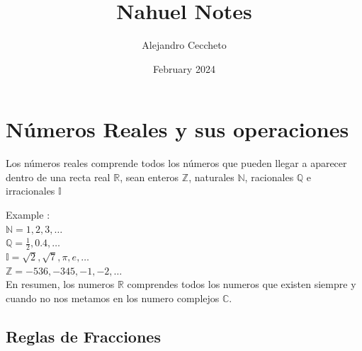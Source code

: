 \documentclass{article}
\title{Nahuel Notes}
\author{Alejandro Ceccheto}
\date{February 2024}
\begin{document}
	
	\maketitle
	
	
	\pagebreak
	\tableofcontents
	\pagebreak
	
	
	\section{Números Reales y sus operaciones}
	\begin{theo}
		Los números reales comprende todos los números que pueden llegar a aparecer dentro de una recta real $\mathbb{R}$, sean enteros $\mathbb{Z}$, naturales $\mathbb{N}$, racionales $\mathbb{Q}$ e irracionales $\mathbb{I}$
	\end{theo}
	
	\vspace{1cm}
	
	Example : \\ 
	
	$\mathbb{N} = 1, 2, 3, \dots$ \\
	
	$\mathbb{Q} = \frac{1}{2}, 0.4, \dots$ \\
	
	$\mathbb{I} = \sqrt{2}, \sqrt{7}, \pi, e, \dots$ \\
	
	$\mathbb{Z} = -536, -345, -1, -2, \dots$ \\
	
	En resumen, los numeros $\mathbb{R}$ comprendes todos los numeros que existen siempre y cuando no nos metamos en los numero complejos $\mathbb{C}$.
	
	
	\subsection{Reglas de Fracciones}
	
\end{document}
